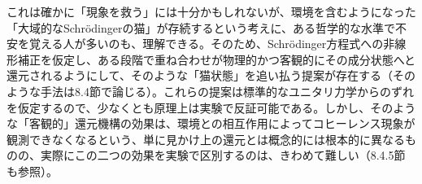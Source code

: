 \hypertarget{srcpage:28}{}\label{srcpage:28}
これは確かに「現象を救う」には十分かもしれないが、環境を含むようになった「大域的なSchrödingerの猫」が存続するという考えに、ある哲学的な水準で不安を覚える人が多いのも、理解できる。そのため、Schrödinger方程式への非線形補正を仮定し、ある段階で重ね合わせが物理的かつ客観的にその成分状態へと還元されるようにして、そのような「猫状態」を追い払う提案が存在する（そのような手法は8.4節で論じる）。これらの提案は標準的なユニタリ力学からのずれを仮定するので、少なくとも原理上は実験で反証可能である。しかし、そのような「客観的」還元機構の効果は、環境との相互作用によってコヒーレンス現象が観測できなくなるという、単に見かけ上の還元とは概念的には根本的に異なるものの、実際にこの二つの効果を実験で区別するのは、きわめて難しい（8.4.5節も参照）。
